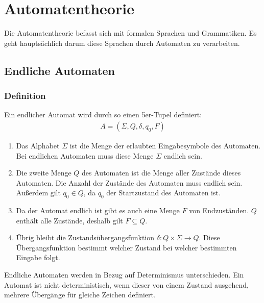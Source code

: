 \chapter{Automatentheorie}
\begin{flushleft}
    Die Automatentheorie befasst sich mit formalen Sprachen und Grammatiken.
    Es geht hauptsächlich darum diese Sprachen durch Automaten zu verarbeiten.
\end{flushleft}

\section{Endliche Automaten}
\subsection{Definition}
\begin{flushleft}
    Ein endlicher Automat wird durch so einen 5er-Tupel definiert:
    \begin{align}
        A=(\Sigma,Q,\delta,q_0,F)
    \end{align}
    \begin{enumerate}
        \item {
            Das Alphabet $\Sigma$ ist die Menge der erlaubten Eingabesymbole des Automaten.
            Bei endlichen Automaten muss diese Menge $\Sigma$ endlich sein.
        }
        \item {
            Die zweite Menge $Q$ des Automaten ist die Menge aller Zustände dieses Automaten.
            Die Anzahl der Zustände des Automaten muss endlich sein.
            Außerdem gilt $q_0 \in Q$, da $q_0$ der Startzustand des Automaten ist.
        }
        \item {
            Da der Automat endlich ist gibt es auch eine Menge $F$ von Endzuständen.
            $Q$ enthält alle Zustände, deshalb gilt $F \subseteq Q$.
        }
        \item {
            Übrig bleibt die Zustandsübergangsfunktion $\delta: Q \times \Sigma \rightarrow Q$.
            Diese Übergangsfunktion bestimmt welcher Zustand bei welcher bestimmten Eingabe folgt.
        }
    \end{enumerate}
    Endliche Automaten werden in Bezug auf Determinismus unterschieden.
    Ein Automat ist nicht deterministisch, wenn dieser von einem Zustand ausgehend, mehrere Übergänge
    für gleiche Zeichen definiert.
\end{flushleft}

